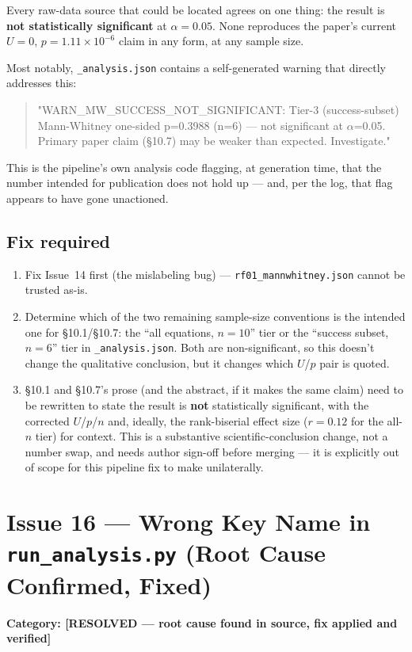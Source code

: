 \documentclass[11pt]{article}
\begin{document}
Every raw-data source that could be located agrees on one thing: the
result is \textbf{not statistically significant} at $\alpha=0.05$. None
reproduces the paper's current $U=0$, $p=1.11\times10^{-6}$ claim in any
form, at any sample size.

Most notably, \texttt{\_analysis.json} contains a self-generated warning
that directly addresses this:
\begin{quote}
\small\ttfamily
"WARN\_MW\_SUCCESS\_NOT\_SIGNIFICANT: Tier-3 (success-subset) Mann-Whitney
one-sided p=0.3988 (n=6) --- not significant at $\alpha$=0.05. Primary
paper claim (\S10.7) may be weaker than expected. Investigate."
\end{quote}
This is the pipeline's own analysis code flagging, at generation time,
that the number intended for publication does not hold up --- and,
per the log, that flag appears to have gone unactioned.

\subsection*{Fix required}
\begin{enumerate}[leftmargin=1.5em]
  \item Fix Issue~14 first (the mislabeling bug) --- \texttt{rf01\_mannwhitney.json}
    cannot be trusted as-is.
  \item Determine which of the two remaining sample-size conventions is the
    intended one for \S10.1/\S10.7: the ``all equations, $n=10$'' tier or
    the ``success subset, $n=6$'' tier in \texttt{\_analysis.json}. Both are
    non-significant, so this doesn't change the qualitative conclusion, but
    it changes which $U$/$p$ pair is quoted.
  \item \S10.1 and \S10.7's prose (and the abstract, if it makes the same
    claim) need to be rewritten to state the result is \textbf{not}
    statistically significant, with the corrected $U$/$p$/$n$ and,
    ideally, the rank-biserial effect size ($r=0.12$ for the all-$n$ tier)
    for context. This is a substantive scientific-conclusion change, not a
    number swap, and needs author sign-off before merging --- it is
    explicitly out of scope for this pipeline fix to make unilaterally.
\end{enumerate}

\section*{Issue 16 --- Wrong Key Name in \texttt{run\_analysis.py} (Root Cause Confirmed, Fixed)}
\textbf{Category: [RESOLVED --- root cause found in source, fix applied and verified]}
\end{document}
